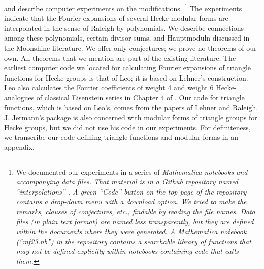\documentclass{article}
\begin{document}
and describe computer experiments
on the modifications. 
\footnote{We documented our experiments in
a series of \it Mathematica \rm notebooks
and accompanying data files.
That material 
is in a \it Github \rm repository 
named ``interpolations'' \cite{test3}. 
A green ``Code'' button on the top page of 
the repository contains a drop-down menu
with a download option.
We tried to
make the remarks, clauses
of conjectures, \it etc., \rm findable by
reading the file names. Data files
(in plain text format) 
are named less transparently, but
they are defined within the
documents where they were generated.
A \it Mathematica \rm notebook 
(``mf23.nb'') in the repository
contains a searchable library 
of functions that may not be defined
explicitly within notebooks 
containing code that calls them.}
\newline \newline \noindent
The experiments indicate that the Fourier
expansions of several
Hecke modular forms are interpolated
in the sense of Raleigh by polynomials.
We describe connections among
these polynomials, certain
divisor sums, and Hauptmoduln 
discussed in  the
Moonshine literature.
We offer only conjectures; 
we prove no theorems
of our own. All theorems that
we mention are part of
the existing literature.
\newline \newline \noindent
The earliest 
computer code
we located 
for calculating 
Fourier 
expansions of 
triangle functions for Hecke groups
is that of Leo; 
it is based on Lehner's 
construction. Leo also
calculates the Fourier coefficients
of weight 4 and weight 6
Hecke-analogues of classical Eisenstein
series in Chapter 4 of \cite{leo2008fourier}.
Our code for triangle functions,
which is based on Leo's,
comes from the papers of 
Lehner and Raleigh.
J. Jermann's package \cite{sagemath}
is also concerned with modular forms
of triangle groups for Hecke groups,
but we did not use his code in our experiments.
For definiteness, we transcribe
our code defining triangle functions
and modular forms in an appendix.
\end{document}
